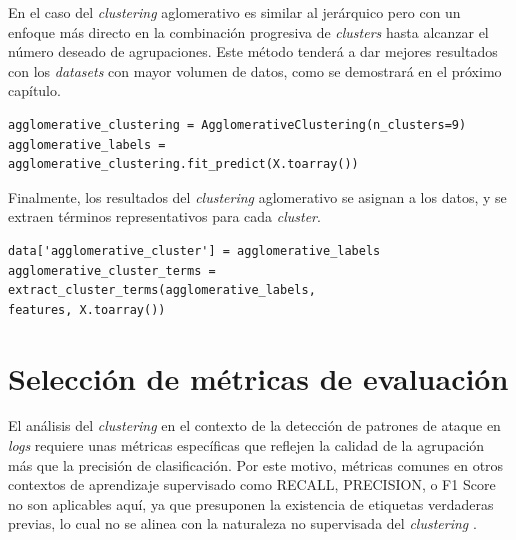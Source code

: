 En el caso del \textit{clustering} aglomerativo es similar al jerárquico pero con un enfoque más directo en la combinación progresiva de \textit{clusters} hasta alcanzar el número deseado de agrupaciones. Este método tenderá a dar mejores resultados con los \textit{datasets} con mayor volumen de datos, como se demostrará en el próximo capítulo.

\begin{center}
    \begin{mdframed}
    \footnotesize
            \begin{verbatim}
agglomerative_clustering = AgglomerativeClustering(n_clusters=9)
agglomerative_labels = agglomerative_clustering.fit_predict(X.toarray())
            \end{verbatim}
    \end{mdframed}
\end{center}

Finalmente, los resultados del \textit{clustering} aglomerativo se asignan a los datos, y se extraen términos representativos para cada \textit{cluster}.

\begin{center}
    \begin{mdframed}
    \footnotesize
            \begin{verbatim}
data['agglomerative_cluster'] = agglomerative_labels
agglomerative_cluster_terms = extract_cluster_terms(agglomerative_labels, 
features, X.toarray())
            \end{verbatim}
    \end{mdframed}
\end{center}


\newpage

\section{Selección de métricas de evaluación}

El análisis del \textit{clustering} en el contexto de la detección de patrones de ataque en \textit{logs} requiere unas métricas específicas que reflejen la calidad de la agrupación más que la precisión de clasificación. Por este motivo, métricas comunes en otros contextos de aprendizaje supervisado como RECALL, PRECISION, o F1 Score no son aplicables aquí, ya que presuponen la existencia de etiquetas verdaderas previas, lo cual no se alinea con la naturaleza no supervisada del \textit{clustering} \cite{Rousseeuw1987}.

